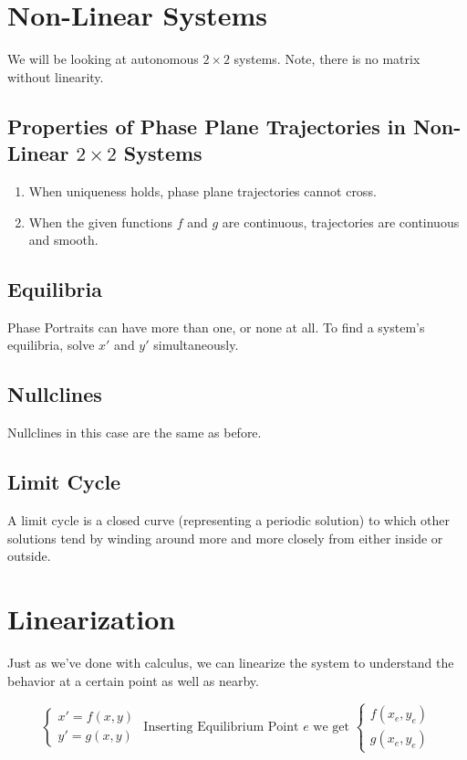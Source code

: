 \documentclass[12pt, landscape, twocolumn]{article}
\begin{document}
\section{Non-Linear Systems}
We will be looking at autonomous $2 \times 2$ systems. Note, there is no matrix without linearity.

    \subsection{Properties of Phase Plane Trajectories in Non-Linear $2 \times 2$ Systems}
    \begin{enumerate}
        \item When uniqueness holds, phase plane trajectories cannot cross.
        \item When the given functions $f$ and $g$ are continuous, trajectories are continuous and smooth.
    \end{enumerate}

    \subsection{Equilibria}
    Phase Portraits can have more than one, or none at all. To find a system's equilibria, solve $x\prime$ and $y\prime$ simultaneously.

    \subsection{Nullclines}
    Nullclines in this case are the same as before.

    \subsection{Limit Cycle}
    A limit cycle is a closed curve (representing a periodic solution) to which other solutions tend by winding around more and more closely from either inside or outside.

\section{Linearization}
Just as we've done with calculus, we can linearize the system to understand the behavior at a certain point as well as nearby.

    \[
        \begin{cases}
            x\prime = f(x, y)\\
            y\prime = g(x, y)
        \end{cases}
        \text{ Inserting Equilibrium Point } e \text{ we get }
        \begin{cases}
            f(x_e, y_e)\\
            g(x_e, y_e)
        \end{cases}
    \]
\end{document}
